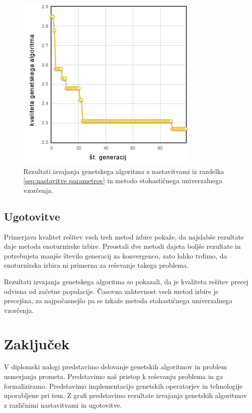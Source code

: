 \documentclass[a4paper, 12pt]{book}
\begin{document}
\begin{figure}
\centering
\includegraphics[scale=0.70]{graph7.png}
\caption{Rezultati izvajanja genetskega algoritma z nastavitvami iz razdelka \ref{seq:nastavitve parametrov} in metodo stohasti\v cnega univerzalnega vzor\v cenja.}
\label{fig5}
\end{figure}

\section{Ugotovitve}

Primerjava kvalitet re\v sitev vseh treh metod izbire poka\v ze, da najslab\v se rezultate daje metoda enoturnirske izbire. Preostali dve metodi dajeta bolj\v se rezultate in potrebujeta manj\v se \v stevilo generacij za konvergenco, zato lahko trdimo, da enoturnirska izbira ni primerna za re\v sevanje takega problema. 

Rezultati izvajanja genetskega algoritma so pokazali, da je kvaliteta re\v sitev precej odvisna od za\v cetne populacije.
\v Casovna zahtevnost vseh metod izbire je precej\v sna, za najpo\v casnej\v so pa se izka\v ze metoda stohasti\v cnega univerzalnega vzor\v cenja.

\chapter{Zaklju\v cek}
V diplomski nalogi predstavimo delovanje genetskih algoritmov in problem usmerjanja prometa.
Predstavimo na\v s pristop k re\v sevanju problema in ga formaliziramo. Predstavimo implementacijo genetskih operatorjev in tehnologije uporabljene pri tem. Z grafi predstavimo rezultate izvajanja genetskih algoritmov z razli\v cnimi nastavitvami in ugotovitve.
\end{document}

